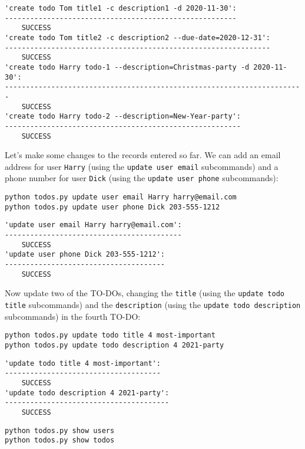 \documentclass[10pt]{amsart}
\numberwithin{equation}{section}
\begin{document}
\begin{verbatim}
'create todo Tom title1 -c description1 -d 2020-11-30':
-------------------------------------------------------
	SUCCESS
'create todo Tom title2 -c description2 --due-date=2020-12-31':
---------------------------------------------------------------
	SUCCESS
'create todo Harry todo-1 --description=Christmas-party -d 2020-11-30':
-----------------------------------------------------------------------
	SUCCESS
'create todo Harry todo-2 --description=New-Year-party':
--------------------------------------------------------
	SUCCESS
\end{verbatim}

Let's make some changes to the records entered so far. We can add an email address
for user \texttt{Harry} (using the \texttt{update user email} subcommands) and a phone number for user \texttt{Dick} 
(using the \texttt{update user phone} subcommands):
\begin{verbatim}
python todos.py update user email Harry harry@email.com
python todos.py update user phone Dick 203-555-1212
\end{verbatim}

\begin{verbatim}
'update user email Harry harry@email.com':
------------------------------------------
	SUCCESS
'update user phone Dick 203-555-1212':
--------------------------------------
	SUCCESS
\end{verbatim}


Now update two of the TO-DOs, changing the \texttt{title} (using the \texttt{update todo
title} subcommands) and the \texttt{description} (using the \texttt{update todo description}
subcommands) in the fourth TO-DO:
\begin{verbatim}
python todos.py update todo title 4 most-important
python todos.py update todo description 4 2021-party
\end{verbatim}

\begin{verbatim}
'update todo title 4 most-important':
-------------------------------------
	SUCCESS
'update todo description 4 2021-party':
---------------------------------------
	SUCCESS
\end{verbatim}


\begin{verbatim}
python todos.py show users
python todos.py show todos
\end{verbatim}
\end{document}
